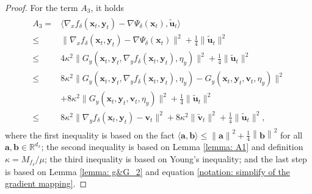 \documentclass[11pt]{article}
\def\va{\mathbf{a}}
\def\vb{\mathbf{b}}
\def\vu{\mathbf{u}}
\def\vv{\mathbf{v}}
\def\vx{\mathbf{x}}
\def\vy{\mathbf{y}}
\def\BR{{\mathbb{R}}}
\newcommand{\norm}[1]{\left\| #1 \right\|}
\begin{document}
\begin{proof}
For the term $A_3$, it holds
\begin{align}\label{ineq: A_3}
\begin{split}
A_3 ={} & \langle\nabla_x f_\delta(\vx_t,\vy_t)-\nabla\Psi_\delta(\vx_t),   \tilde{\vu}_t\rangle\\
\le{} & \|\nabla_x f_\delta(\vx_t,\vy_t) - \nabla \Psi_\delta(\vx_t)\|^2+\frac{1}{4}\|\tilde{\vu}_t\|^2\\
\le{} & 4\kappa^2 \|G_y(\vx_t,\vy_t, \nabla_y    f_\delta(\vx_t,\vy_t),\eta_y)\|^2
    +\frac{1}{4}\|\tilde{\vu}_t\|^2\\
\le{} & 8\kappa^2 \|G_y(\vx_t,\vy_t,\nabla_y f_\delta(\vx_t,\vy_t),\eta_y)-G_y(\vx_t,\vy_t,\vv_t,\eta_y)\|^2 \\
    & +8\kappa^2 \|G_y(\vx_t,\vy_t,\vv_t,\eta_y)\|^2
    +\frac{1}{4}\|\tilde{\vu}_t\|^2\\
\le{} & 8\kappa^2 \|\nabla_y f_\delta(\vx_t,\vy_t)-\vv_t\|^2 +8\kappa^2 \|\tilde{\vv}_t\|^2
    +\frac{1}{4}\|\tilde{\vu}_t\|^2,
\end{split}
\end{align}
where the first inequality is based on the fact $ \langle \va,\vb\rangle \leq \norm{\va}^2 + \frac{1}{4}\norm{\vb}^2$ for all $\va,\vb\in\BR^{d_x}$; the second inequality is based on Lemma \ref{lemma: A1} and definition $\kappa=M_{f_\delta}/\mu$; the third inequality is based on Young's inequality; and the last step is based on Lemma \ref{lemma: g&G_2} and equation \eqref{notation: simplify of the gradient mapping}. 


\end{proof}
\end{document}
